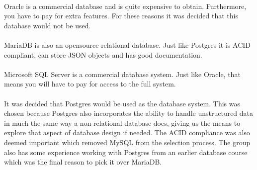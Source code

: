 \\
Oracle is a commercial database and is quite expensive to obtain\cite{oracle}.
Furthermore, you have to pay for extra features.
For these reasons it was decided that this database would not be used.
\\
\\
MariaDB is also an opensource relational database\cite{MariaDB}.
Just like Postgres it is ACID compliant, can store JSON objects and has good documentation.
\\
\\
Microsoft SQL Server is a commercial database system\cite{MSSQLSERVER}.
Just like Oracle, that means you will have to pay for access to the full system.
\\
\\
It was decided that Postgres would be used as the database system.
This was chosen because Postgres also incorporates the ability to handle unstructured data in much the same way a non-relational database does, giving us the means to explore that aspect of database design if needed.
The ACID compliance was also deemed important which removed MySQL from the selection process. 
The group also has some experience working with Postgres from an earlier database course which was the final reason to pick it over MariaDB.

